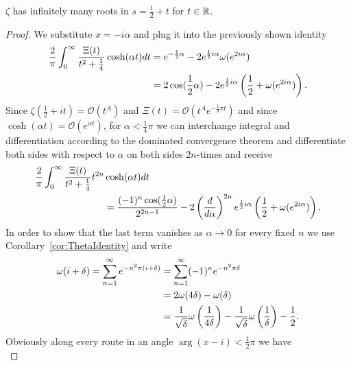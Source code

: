 \begin{theorem}
	$\zeta$ has infinitely many roots in $s = \frac{1}{2} + t$ for $t \in \mathbb{R}$.
\end{theorem}
\begin{proof}
	We substitute $x = -i \alpha$ and plug it into the previously shown identity
\begin{equation*}
\begin{aligned}
	\frac{2}{\pi} \int _0 ^{\infty} \frac{\Xi(t)}{t^2 + \frac{1}{4}} \cosh(\alpha t) dt 
	&= e^{-\frac{1}{2} \alpha} - 2e^{\frac{1}{2} i \alpha} \omega(e^{2 i \alpha}) \\
	&= 2 \cos(\frac{1}{2} \alpha) - 2e^{\frac{1}{2} i \alpha} \left(\frac{1}{2} + \omega(e^{2 i \alpha})\right).
\end{aligned}
\end{equation*}
	Since $\zeta(\frac{1}{2} + it) = \mathcal{O}(t^A)$ and $\Xi(t) = \mathcal{O}(t^A e^{-\frac{1}{4} \pi t})$ and since $\cosh(\alpha t) = \mathcal{O}(e^{\alpha t})$, for $\alpha < \frac{1}{4} \pi$ we can interchange integral and differentiation according to the dominated convergence theorem and differentiate both sides with respect to $\alpha$ on both sides $2n$-times and receive
\begin{equation*}
\begin{aligned}	
	\frac{2}{\pi} \int _0 ^{\infty} \frac{\Xi(t)}{t^2 + \frac{1}{4}} t^{2n}
		&\cosh(\alpha t) dt \\
		&= \frac{(-1)^{n} \cos(\frac{1}{2} \alpha)}{2^{2n - 1}} - 2 \left(\frac{d}{d\alpha}\right)^{2n}e^{\frac{1}{2} i \alpha} \left(\frac{1}{2} + \omega(e^{2 i \alpha})\right).
\end{aligned}
\end{equation*}
	In order to show that the last term vanishes as $\alpha \to 0$ for every fixed $n$ we use Corollary~\ref{cor:ThetaIdentity} and write
\begin{equation*}
\begin{aligned}
	\omega(i + \delta) = \sum _{n=1} ^{\infty} e^{-n^2 \pi (i + \delta)}
		&= \sum _{n=1} ^{\infty} (-1)^n e^{-n^2 \pi \delta} \\
		&= 2 \omega(4 \delta) - \omega(\delta) \\
		&= \frac{1}{\sqrt \delta} \omega\left(\frac{1}{4\delta}\right) - \frac{1}{\sqrt \delta} \omega\left(\frac{1}{\delta}\right) - \frac{1}{2}.
\end{aligned}
\end{equation*}
	Obviously along every route in an angle $\arg(x - i) < \frac{1}{2} \pi$ we have
\begin{equation*}

\end{equation*}
\end{proof}
